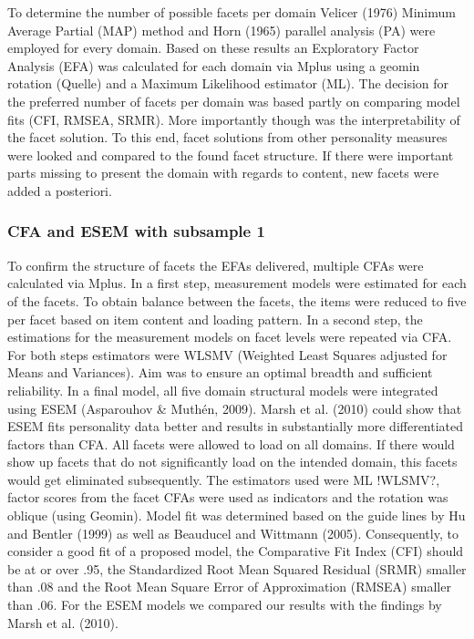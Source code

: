 \documentclass[,man]{apa6}
\theoremstyle{definition}
\theoremstyle{definition}
\theoremstyle{definition}
\theoremstyle{remark}
\begin{document}
To determine the number of possible facets per domain Velicer (1976)
Minimum Average Partial (MAP) method and Horn (1965) parallel analysis
(PA) were employed for every domain. Based on these results an
Exploratory Factor Analysis (EFA) was calculated for each domain via
Mplus using a geomin rotation (Quelle) and a Maximum Likelihood
estimator (ML). The decision for the preferred number of facets per
domain was based partly on comparing model fits (CFI, RMSEA, SRMR). More
importantly though was the interpretability of the facet solution. To
this end, facet solutions from other personality measures were looked
and compared to the found facet structure. If there were important parts
missing to present the domain with regards to content, new facets were
added a posteriori.

\hypertarget{cfa-and-esem-with-subsample-1}{%
\subsubsection{CFA and ESEM with subsample
1}\label{cfa-and-esem-with-subsample-1}}

To confirm the structure of facets the EFAs delivered, multiple CFAs
were calculated via Mplus. In a first step, measurement models were
estimated for each of the facets. To obtain balance between the facets,
the items were reduced to five per facet based on item content and
loading pattern. In a second step, the estimations for the measurement
models on facet levels were repeated via CFA. For both steps estimators
were WLSMV (Weighted Least Squares adjusted for Means and Variances).
Aim was to ensure an optimal breadth and sufficient reliability. In a
final model, all five domain structural models were integrated using
ESEM (Asparouhov \& Muthén, 2009). Marsh et al. (2010) could show that
ESEM fits personality data better and results in substantially more
differentiated factors than CFA. All facets were allowed to load on all
domains. If there would show up facets that do not significantly load on
the intended domain, this facets would get eliminated subsequently. The
estimators used were ML !WLSMV?, factor scores from the facet CFAs were
used as indicators and the rotation was oblique (using Geomin). Model
fit was determined based on the guide lines by Hu and Bentler (1999) as
well as Beauducel and Wittmann (2005). Consequently, to consider a good
fit of a proposed model, the Comparative Fit Index (CFI) should be at or
over .95, the Standardized Root Mean Squared Residual (SRMR) smaller
than .08 and the Root Mean Square Error of Approximation (RMSEA) smaller
than .06. For the ESEM models we compared our results with the findings
by Marsh et al. (2010).
\end{document}
